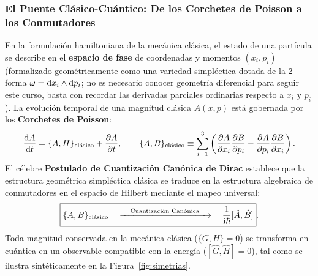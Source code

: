 \subsubsection{El Puente Clásico-Cuántico: De los Corchetes de Poisson a los Conmutadores}
En la formulación hamiltoniana de la mecánica clásica, el estado de una partícula se describe en el \textbf{espacio de fase} de coordenadas y momentos $(x_i, p_i)$ (formalizado geométricamente como una variedad simpléctica dotada de la 2-forma $\omega = \mathrm{d} x_i \wedge \mathrm{d} p_i$; no es necesario conocer geometría diferencial para seguir este curso, basta con recordar las derivadas parciales ordinarias respecto a $x_i$ y $p_i$). La evolución temporal de una magnitud clásica $A(x, p)$ está gobernada por los \textbf{Corchetes de Poisson}:
\begin{equation}
    \frac{\mathrm{d} A}{\mathrm{d} t} = \{A, H\}_{\text{clásico}} + \frac{\partial A}{\partial t}, \qquad \{A, B\}_{\text{clásico}} \equiv \sum_{i=1}^3 \left( \frac{\partial A}{\partial x_i}\frac{\partial B}{\partial p_i} - \frac{\partial A}{\partial p_i}\frac{\partial B}{\partial x_i} \right).
\end{equation}
El célebre \textbf{Postulado de Cuantización Canónica de Dirac} establece que la estructura geométrica simpléctica clásica se traduce en la estructura algebraica de conmutadores en el espacio de Hilbert mediante el mapeo universal:
\begin{equation}
    \boxed{\{A, B\}_{\text{clásico}} \quad \xrightarrow{\quad \text{Cuantización Canónica} \quad} \quad \frac{1}{\mathrm{i}\hbar}[\hat{A}, \hat{B}]}.
    \label{eq:dirac_canonical_quantization}
\end{equation}
Toda magnitud conservada en la mecánica clásica ($\{G, H\} = 0$) se transforma en cuántica en un observable compatible con la energía ($[\hat{G}, \hat{H}] = 0$), tal como se ilustra sintéticamente en la Figura~\ref{fig:simetrias}.


